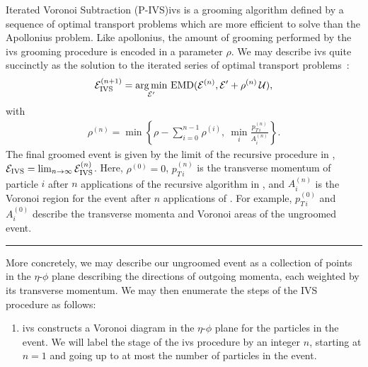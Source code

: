 \begin{definitionbox}{Iterated Voronoi Subtraction (P-IVS)}{ivs}
     is a grooming algorithm defined by a sequence of optimal transport problems which are more efficient to solve than the Apollonius problem.
    Like \gls{apollonius}, the amount of grooming performed by the \gls{ivs} grooming procedure is encoded in a parameter \(\rho\).
    We may describe \gls{ivs} quite succinctly as the solution to the iterated series of optimal transport problems~\cite{Komiske:2020qhg}:
    \begin{align}
        \mathcal{E}^{(n+1)}_{\rm IVS}
        =
        \underset{\mathcal{E}'}{\arg \min} ~ {\rm EMD}
        (\mathcal{E}^{(n)}, \mathcal{E}' + \rho^{(n)}\,\mathcal{U})
        \label{eq:ivs1}
        ,
    \end{align}
    with
    \begin{align}
        \rho^{(n)} =
        \min\left\{
            \rho - \sum_{i=0}^{n-1}\rho^{(i)},
        ~
        \min_i \frac{p^{(n)}_{T\,i}}{A^{(n)}_i}
        \right\}
        \label{eq:ivs2}
        .
    \end{align}
    The final groomed event is given by the limit of the recursive procedure in , \(\mathcal{E}_{\rm IVS} = \lim_{n\to\infty} \mathcal{E}^{(n)}_{\rm IVS}\).
    Here, \(\rho^{(0)} = 0\), \(p_{T\,i}^{(n)}\) is the transverse momentum of particle \(i\) after \(n\) applications of the recursive algorithm in , and \(A_i^{(n)}\) is the Voronoi region for the event after \(n\) applications of .
    For example, \(p_{T\, i}^{(0)}\) and \(A_i^{(0)}\) describe the transverse momenta and Voronoi areas of the ungroomed event.

    \vspace{7pt}
    \hrule
    \vspace{7pt}

    More concretely, we may describe our ungroomed event as a collection of points in the \(\eta\)-\(\phi\) plane describing the directions of outgoing momenta, each weighted by its transverse momentum.
    We may then enumerate the steps of the IVS procedure as follows:
    \begin{enumerate}
        \item
        \gls{ivs} constructs a Voronoi diagram in the \(\eta\)-\(\phi\) plane for the particles in the event.
        We will label the stage of the \gls{ivs} procedure by an integer \(n\), starting at \(n = 1\) and going up to at most the number of particles in the event.
        \label{enum:ivs_1}


\end{enumerate}
\end{definitionbox}
